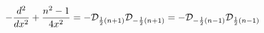 \begin{equation}
-\frac{d^2}{dx^2}+\frac{n^2-1}{4x^2}=-
{\cal D}_{\frac{1}{2}(n+1)}
{\cal D}_{-\frac{1}{2}(n+1)}=
-{\cal D}_{-\frac{1}{2}(n-1)}
{\cal D}_{\frac{1}{2}(n-1)}
\label{factor}
\end{equation}

